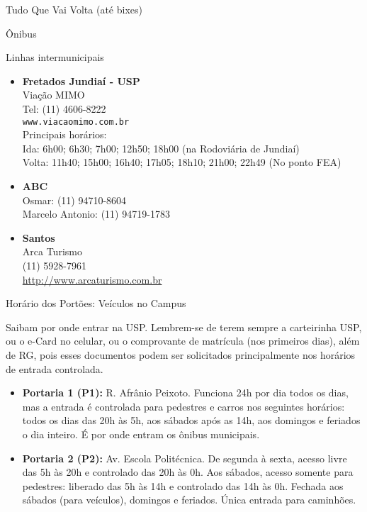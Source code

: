 \begin{secao}{Tudo Que Vai Volta (até bixes)}
\begin{subsecao}{Ônibus}
\begin{subsubsecao}{Linhas intermunicipais}
\begin{itemize}
  \item {\bf Fretados Jundiaí - USP}\\
    Viação MIMO\\
    Tel: (11) 4606-8222\\
    {\tt www.viacaomimo.com.br}\\
    Principais horários:\\
    Ida: 6h00; 6h30; 7h00; 12h50; 18h00 (na Rodoviária de Jundiaí)\\
    Volta: 11h40; 15h00; 16h40; 17h05; 18h10; 21h00; 22h49 (No ponto FEA)

  \item {\bf ABC}\\
    Osmar: (11) 94710-8604\\
    Marcelo Antonio: (11) 94719-1783

  \item {\bf Santos}\\
    Arca Turismo\\
    (11) 5928-7961\\
    \url{http://www.arcaturismo.com.br}

\end{itemize}

\end{subsubsecao}

\end{subsecao}


\begin{subsecao}{Horário dos Portões: Veículos no Campus}

Saibam por onde entrar na USP. Lembrem-se de terem sempre a carteirinha USP, ou
o e-Card no celular, ou o comprovante de matrícula (nos primeiros dias), além de
RG, pois esses documentos podem ser solicitados principalmente nos horários de 
entrada controlada.
\begin{itemize}
  \item {\bf Portaria 1 (P1):} R. Afrânio Peixoto. Funciona 24h por dia todos os
  	dias, mas a entrada é controlada para pedestres e carros nos seguintes
	horários: todos os dias das 20h às 5h, aos sábados após as 14h, aos domingos
	e feriados o dia inteiro. É por onde entram os ônibus municipais.

  \item {\bf Portaria 2 (P2):} Av. Escola Politécnica. De segunda à sexta,
  	acesso livre das 5h às 20h e controlado das 20h às 0h. Aos sábados, acesso
	somente para pedestres: liberado das 5h às 14h e controlado das 14h às 0h.
	Fechada aos sábados (para veículos), domingos e feriados. Única entrada para
	caminhões.


\end{itemize}
\end{subsecao}
\end{secao}
